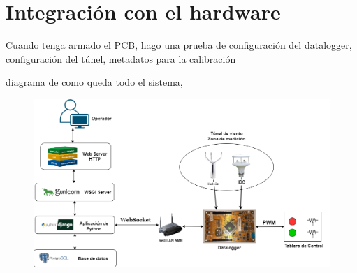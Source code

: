 \section{Integración con el hardware}
Cuando tenga armado el PCB, hago una prueba de configuración del datalogger, configuración del túnel, metadatos para la calibración

diagrama de como queda todo el sistema, 
\begin{figure}[H]
    \centering
    \includegraphics[width=0.9\linewidth]{Figuras/AplicacionWeb/integracionHardware/DiagramaSistemaDesarrollar.png}
    \caption{}
    \label{fig:}
\end{figure}



